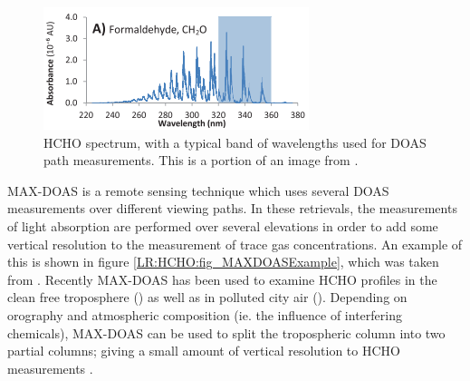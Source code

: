    \begin{figure}
      \includegraphics{Figures/HCHO/HCHOAbsorbanceDavenport.png}
      \caption{ %
        HCHO spectrum, with a typical band of wavelengths used for DOAS path measurements.
        This is a portion of an image from \cite{Davenport2015}.}
        \label{LR:HCHO:Measurements:fig_HCHOSpectrum}
    \end{figure}
      
    MAX-DOAS is a remote sensing technique which uses several DOAS measurements over different viewing paths.
    In these retrievals, the measurements of light absorption are performed over several elevations in order to add some vertical resolution to the measurement of trace gas concentrations.
    An example of this is shown in figure \ref{LR:HCHO:fig_MAXDOASExample}, which was taken from \cite{Lee2015}.
    Recently MAX-DOAS has been used to examine HCHO profiles in the clean free troposphere (\cite{Franco2015, Schreier2016}) as well as in polluted city air (\cite{Lee2015}).
    Depending on orography and atmospheric composition (ie. the influence of interfering chemicals), MAX-DOAS can be used to split the tropospheric column into two partial columns; giving a small amount of vertical resolution to HCHO measurements \citep[eg.]{Franco2015, Lee2015}.
    
